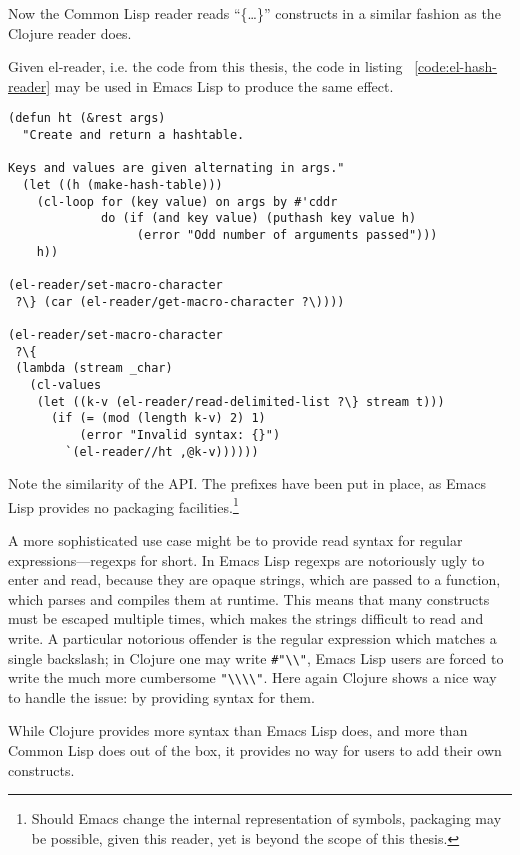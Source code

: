 \documentclass[a4paper,10pt,twoside]{report}
\newcommand{\el}{Emacs Lisp}
\newcommand{\cl}{Common Lisp}
\newcommand{\elr}{el-reader}
\begin{document}
Now the \cl{} reader reads ``\{\ldots{}\}'' constructs in a similar fashion as
the Clojure reader does.

Given \elr{}, i.e. the code from this thesis, the code in listing
~\ref{code:el-hash-reader} may be used in \el{} to produce the same effect.

\begin{lstlisting}[style=lispcode,caption={An equivalent read macro using
  \elr{}.}, label={code:el-hash-reader}]
(defun ht (&rest args)
  "Create and return a hashtable.

Keys and values are given alternating in args."
  (let ((h (make-hash-table)))
    (cl-loop for (key value) on args by #'cddr
             do (if (and key value) (puthash key value h)
                  (error "Odd number of arguments passed")))
    h))

(el-reader/set-macro-character
 ?\} (car (el-reader/get-macro-character ?\))))

(el-reader/set-macro-character
 ?\{
 (lambda (stream _char)
   (cl-values
    (let ((k-v (el-reader/read-delimited-list ?\} stream t)))
      (if (= (mod (length k-v) 2) 1)
          (error "Invalid syntax: {}")
        `(el-reader//ht ,@k-v))))))
\end{lstlisting}

Note the similarity of the API.  The prefixes have been put in place, as \el{}
provides no packaging facilities.\footnote{Should Emacs change the internal
  representation of symbols, packaging may be possible, given this reader, yet
  is beyond the scope of this thesis.}

A more sophisticated use case might be to provide read syntax for regular
expressions---regexps for short.  In \el{} regexps are notoriously ugly to enter
and read, because they are opaque strings, which are passed to a function, which
parses and compiles them at runtime.  This means that many constructs must be
escaped multiple times, which makes the strings difficult to read and write.  A
particular notorious offender is the regular expression which matches a single
backslash; in Clojure one may write \texttt{\#"\textbackslash\textbackslash"},
\el{} users are forced to write the much more cumbersome
\texttt{"\textbackslash\textbackslash\textbackslash\textbackslash"}.  Here again
Clojure shows a nice way to handle the issue: by providing syntax for them.

While Clojure provides more syntax than \el{} does, and more than \cl{} does out
of the box, it provides no way for users to add their own constructs.
\end{document}
